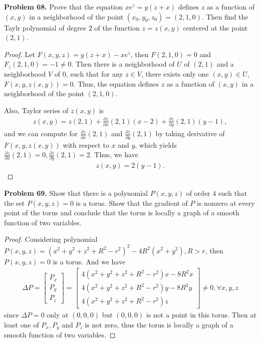 \documentclass[12pt,leqno]{amsart}
\theoremstyle{definition}
\begin{document}
\noindent
{\bf Problem 68.}
Prove that the equation $xe^z=y(z+x)$ defines $z$ as a function of $(x,y)$ in a neighborhood of the point
$(x_0,y_0,z_0)=(2,1,0)$. Then find the Taylr polynomial
of degree $2$ of the function $z=z(x,y)$ centered at the point
$(2,1)$.
\begin{proof}
Let $F(x,y,z) = y(z+x) - x e^z$, then $F(2,1,0) = 0$ and $F_z(2,1,0) = -1 \neq 0$. Then there is a neighborhood of $U$ of $(2,1)$ and a neighborhood $V$ of $0$, such that for any $z\in V$, there exists only one $(x,y) \in U$, $F(x,y,z(x,y)) = 0$. Thus, the equation defines $z$ as a function of $(x,y)$ in a neighborhood of the point
$(2,1,0)$. 

Also, Taylor series of $z(x,y)$ is 
\begin{align*}
    z(x,y) = z(2,1) + \frac{\partial z}{\partial x}(2,1) (x-2) + \frac{\partial z}{\partial y}(2,1) (y-1),
\end{align*}
and we can compute for $\frac{\partial z}{\partial x}(2,1)$ and $\frac{\partial z}{\partial y}(2,1)$ by taking derivative of $F(x,y,z(x,y))$ with respect to $x$ and $y$, which yields $\frac{\partial z}{\partial x}(2,1) = 0, \frac{\partial z}{\partial y}(2,1) = 2$. Thus, we have 
\begin{align*}
    z(x,y) = 2 (y-1).
\end{align*}
\end{proof}

\medskip

\noindent
{\bf Problem 69.}
Show that there is a polynomial $P(x,y,z)$ of order $4$ such that
the set $P(x,y,z)=0$ is a torus. Show that the gradient of $P$ is nonzero at every point of the torus and conclude that the torus is locally a graph of a smooth function of two variables.
\begin{proof}
Considering polynomial $P(x,y,z) = (x^2 + y^2 + z^2 + R^2 - r^2)^2 - 4R^2(x^2 + y^2), R > r$, then $P(x,y,z) = 0$ is a torus. And we have 
\begin{align*}
    \Delta P = \begin{bmatrix}
        P_x \\
        P_y \\
        P_z
    \end{bmatrix} = \begin{bmatrix}
        4 (x^2 + y^2 + z^2 + R^2 - r^2)x - 8 R^2 x\\
        4 (x^2 + y^2 + z^2 + R^2 - r^2)y - 8 R^2 y \\
        4 (x^2 + y^2 + z^2 + R^2 - r^2)z
    \end{bmatrix}
    \neq 0, \forall x,y,z
\end{align*}
since $\Delta P = 0$ only at $(0,0,0)$ but $(0,0,0)$ is not a point in this torus. Then at least one of $P_x, P_y$ and $P_z$ is not zero, thus the torus is locally a graph of a smooth function of two variables.
\end{proof}
\end{document}
